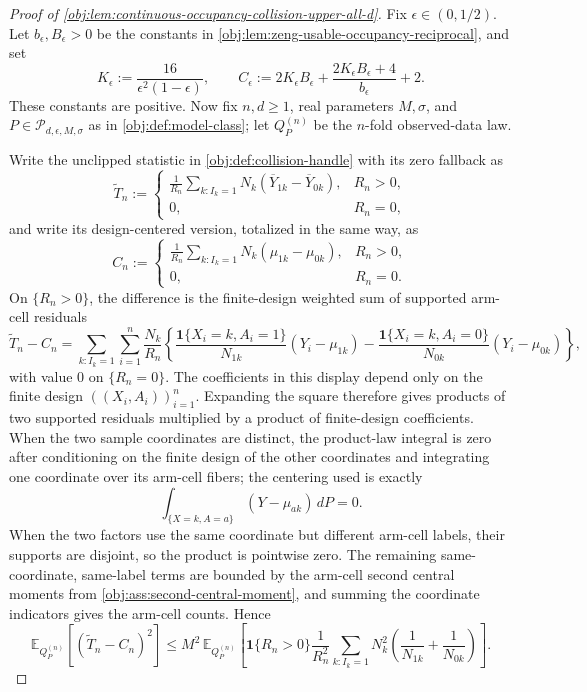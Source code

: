 \documentclass[11pt]{article}
\begin{document}
\begin{proof}[Proof of \cref{obj:lem:continuous-occupancy-collision-upper-all-d}]
Fix \(\epsilon\in(0,1/2)\).  Let \(b_\epsilon,B_\epsilon>0\) be the constants in \cref{obj:lem:zeng-usable-occupancy-reciprocal}, and set
\[
K_\epsilon:=\frac{16}{\epsilon^2(1-\epsilon)},\qquad
C_\epsilon:=2K_\epsilon B_\epsilon+
\frac{2K_\epsilon B_\epsilon+4}{b_\epsilon}+2 .
\]
These constants are positive.  Now fix \(n,d\ge1\), real parameters \(M,\sigma\), and \(P\in\mathcal P_{d,\epsilon,M,\sigma}\) as in \cref{obj:def:model-class}; let \(Q_P^{(n)}\) be the \(n\)-fold observed-data law. %

Write the unclipped statistic in \cref{obj:def:collision-handle} with its zero fallback as
\[
\widetilde T_n
:=
\begin{cases}
\displaystyle
\frac1{R_n}
\sum_{k:I_k=1}N_k(\overline Y_{1k}-\overline Y_{0k}),& R_n>0,\\[1ex]
0,& R_n=0,
\end{cases}
\]
and write its design-centered version, totalized in the same way, as
\[
C_n
:=
\begin{cases}
\displaystyle
\frac1{R_n}
\sum_{k:I_k=1}N_k(\mu_{1k}-\mu_{0k}),& R_n>0,\\[1ex]
0,& R_n=0.
\end{cases}
\]
On \(\{R_n>0\}\), the difference is the finite-design weighted sum of supported arm-cell residuals
\[
\widetilde T_n-C_n
=
\sum_{k:I_k=1}\sum_{i=1}^n
\frac{N_k}{R_n}
\left\{
\frac{\mathbf 1\{X_i=k,A_i=1\}}{N_{1k}}(Y_i-\mu_{1k})
-
\frac{\mathbf 1\{X_i=k,A_i=0\}}{N_{0k}}(Y_i-\mu_{0k})
\right\},
\]
with value \(0\) on \(\{R_n=0\}\).  The coefficients in this display depend only on the finite design \(((X_i,A_i))_{i=1}^n\).  Expanding the square therefore gives products of two supported residuals multiplied by a product of finite-design coefficients.  When the two sample coordinates are distinct, the product-law integral is zero after conditioning on the finite design of the other coordinates and integrating one coordinate over its arm-cell fibers; the centering used is exactly
\[
\int_{\{X=k,A=a\}}(Y-\mu_{ak})\,dP=0.
\]
When the two factors use the same coordinate but different arm-cell labels, their supports are disjoint, so the product is pointwise zero.  The remaining same-coordinate, same-label terms are bounded by the arm-cell second central moments from \cref{obj:ass:second-central-moment}, and summing the coordinate indicators gives the arm-cell counts.  Hence
\[
\mathbb E_{Q_P^{(n)}}\!\left[(\widetilde T_n-C_n)^2\right]
\le
M^2\,
\mathbb E_{Q_P^{(n)}}\!\left[
\mathbf 1\{R_n>0\}\frac1{R_n^2}
\sum_{k:I_k=1}N_k^2
\left(\frac1{N_{1k}}+\frac1{N_{0k}}\right)
\right].
\]


\end{proof}
\end{document}
